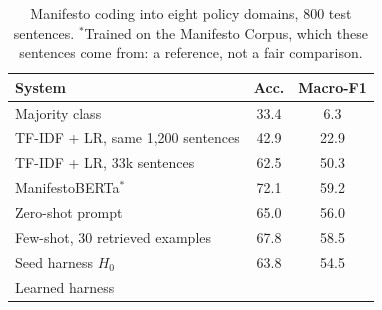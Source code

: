 \begin{table}[t]
\centering\small
\setlength{\tabcolsep}{4pt}
\begin{tabular}{@{}lcc@{}}
\toprule
System & Acc. & Macro-F1 \\
\midrule
Majority class & 33.4 & 6.3 \\
TF-IDF + LR, same 1{,}200 sentences & 42.9 & 22.9 \\
TF-IDF + LR, 33k sentences & 62.5 & 50.3 \\
ManifestoBERTa$^\ast$ & 72.1 & 59.2 \\
\midrule
Zero-shot prompt & 65.0 & 56.0 \\
Few-shot, 30 retrieved examples & 67.8 & 58.5 \\
Seed harness $H_0$ & 63.8 & 54.5 \\
Learned harness & \gapcell{} & \gapcell{} \\
\bottomrule
\end{tabular}
\caption{Manifesto coding into eight policy domains, 800 test sentences. $^\ast$Trained on the Manifesto Corpus, which these sentences come from: a reference, not a fair comparison.}
\label{tab:manifesto}
\end{table}
